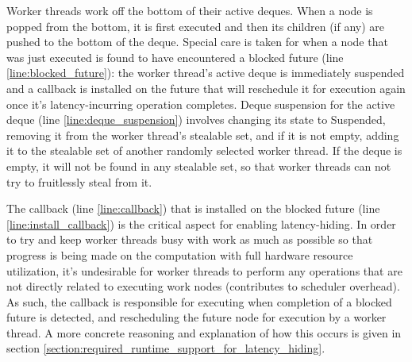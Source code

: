 \documentclass[bsc,frontabs,singlespacing,parskip,deptreport,normalheadings]{infthesis}
\begin{document}
Worker threads work off the bottom of their active deques. When a node is popped
from the bottom, it is first executed and then its children (if any) are pushed
to the bottom of the deque. Special care is taken for when a node that was just
executed is found to have encountered a blocked future (line
\ref{line:blocked_future}): the worker thread's active deque is immediately
suspended and a callback is installed on the future that will reschedule it for
execution again once it's latency-incurring operation completes. Deque
suspension for the active deque (line \ref{line:deque_suspension}) involves
changing its state to Suspended, removing it from the worker thread's stealable
set, and if it is not empty, adding it to the stealable set of another randomly
selected worker thread. If the deque is empty, it will not be found in any
stealable set, so that worker threads can not try to fruitlessly steal from it. 

The callback (line \ref{line:callback}) that is installed on the blocked future
(line \ref{line:install_callback}) is the critical aspect for enabling
latency-hiding. In order to try and keep worker threads busy with work as much
as possible so that progress is being made on the computation with full hardware
resource utilization, it's undesirable for worker threads to perform any
operations that are not directly related to executing work nodes (contributes to
scheduler overhead). As such, the callback is responsible for executing when
completion of a blocked future is detected, and rescheduling the future node for
execution by a worker thread. A more concrete reasoning and explanation of how
this occurs is given in section
\ref{section:required_runtime_support_for_latency_hiding}.
\end{document}
